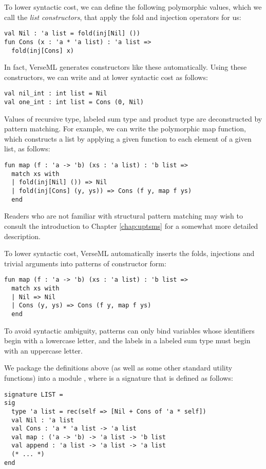 To lower syntactic cost, we can define the following polymorphic values, which we call the \emph{list constructors}, that apply the fold and injection operators for us:
\begin{lstlisting}[numbers=none]
val Nil : 'a list = fold(inj[Nil] ())
fun Cons (x : 'a * 'a list) : 'a list => 
  fold(inj[Cons] x)
\end{lstlisting}
In fact, VerseML generates constructors like these automatically. %
Using these constructors, we can write  and  at lower syntactic cost as follows:
\begin{lstlisting}[numbers=none]
val nil_int : int list = Nil
val one_int : int list = Cons (0, Nil)
\end{lstlisting}

Values of recursive type, labeled sum type and product type are deconstructed by pattern matching. For example, we can write the polymorphic map function, which constructs a  list by applying a given function to each element of a given list, as follows:
\begin{lstlisting}[numbers=none]
fun map (f : 'a -> 'b) (xs : 'a list) : 'b list => 
  match xs with 
  | fold(inj[Nil] ()) => Nil
  | fold(inj[Cons] (y, ys)) => Cons (f y, map f ys)
  end
\end{lstlisting}
Readers who are not familiar with structural pattern matching may wish to consult the introduction to Chapter \ref{chap:uptsms} for a somewhat more detailed description.

To lower syntactic cost, VerseML automatically inserts the folds, injections and trivial arguments into patterns of constructor form:
\begin{lstlisting}[numbers=none]
fun map (f : 'a -> 'b) (xs : 'a list) : 'b list => 
  match xs with 
  | Nil => Nil 
  | Cons (y, ys) => Cons (f y, map f ys)
  end
\end{lstlisting}
To avoid syntactic ambiguity, patterns can only bind variables whose identifiers begin with a lowercase letter, and the labels in a labeled sum type must begin with an uppercase letter. 

We package the definitions above (as well as some other standard utility functions) into a module , where  is a signature that is defined as follows:
\begin{lstlisting}[numbers=none]
signature LIST = 
sig 
  type 'a list = rec(self => [Nil + Cons of 'a * self])
  val Nil : 'a list
  val Cons : 'a * 'a list -> 'a list
  val map : ('a -> 'b) -> 'a list -> 'b list
  val append : 'a list -> 'a list -> 'a list
  (* ... *)
end
\end{lstlisting}

